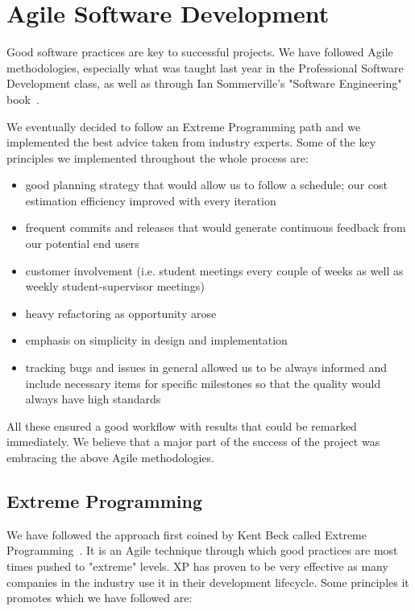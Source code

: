 \documentclass{l4proj}
\begin{document}

\chapter{Agile Software Development}
\label{agile-software-development}

Good software practices are key to successful projects. We have followed Agile methodologies, especially what was taught last year in the Professional Software Development class, as well as through Ian Sommerville's "Software Engineering" book~\cite{software-engineering}.

We eventually decided to follow an Extreme Programming path and we implemented the best advice taken from industry
experts. Some of the key principles we implemented throughout the whole process are:
\begin{itemize}
    \item good planning strategy that would allow us to follow a schedule; our cost estimation efficiency improved with every iteration
    \item frequent commits and releases that would generate continuous feedback from our potential end users
    \item customer involvement (i.e. student meetings every couple of weeks as well as weekly student-supervisor meetings)
    \item heavy refactoring as opportunity arose
    \item emphasis on simplicity in design and implementation
    \item tracking bugs and issues in general allowed us to be always informed and include necessary items for specific milestones so that the quality would always have high standards
\end{itemize}

All these ensured a good workflow with results that could be remarked immediately. We believe that a major part of the
success of the project was embracing the above Agile methodologies.

\section{Extreme Programming}

We have followed the approach first coined by Kent Beck called Extreme Programming~\cite{extreme-programming}. It is an Agile technique through which good practices are most times pushed to "extreme" levels. XP has proven to be very effective as many companies in the industry use it in their development lifecycle. Some principles it promotes which we have followed are:
\end{document}
